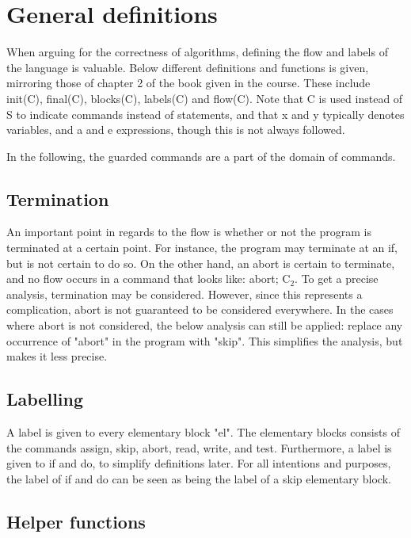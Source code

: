 \section{General definitions}

\docpar
When arguing for the correctness of algorithms, defining the flow and labels of the language is
valuable. Below different definitions and functions is given, mirroring those of chapter 2 of the
book given in the course. These include init(C), final(C), blocks(C), labels(C) and flow(C).
Note that C is used instead of S to indicate commands instead of statements, and that
x and y typically denotes variables, and a and e expressions, though this is not always followed.

In the following, the guarded commands are a part of the domain of commands.

\subsection{Termination}

An important point in regards to the flow is whether or not the program is terminated
at a certain point. For instance, the program may terminate at an if, but is not
certain to do so. On the other hand, an abort is certain to terminate, and no flow
occurs in a command that looks like: abort; C$_2$. To get a precise analysis, termination
may be considered. However, since this represents a complication, abort is not guaranteed
to be considered everywhere. In the cases where abort is not considered, the below analysis
can still be applied: replace any occurrence of "abort" in the program with "skip".
This simplifies the analysis, but makes it less precise.

\subsection{Labelling}

A label is given to every elementary block "el". The elementary blocks consists of
the commands assign, skip, abort, read, write, and test. Furthermore, a label is given
to if and do, to simplify definitions later. For all intentions and purposes, the
label of if and do can be seen as being the label of a skip elementary block.

\subsection{Helper functions}

